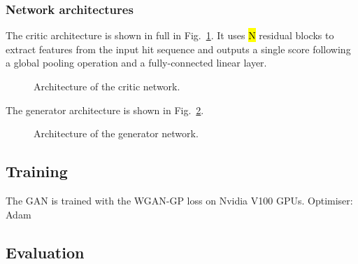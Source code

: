     
\subsubsection{Network architectures}

The critic architecture is shown in full in Fig.~\ref{fig:disc_arch}. It uses \hl{N} residual blocks to extract features from the input hit sequence and outputs a single score following a global pooling operation and a fully-connected linear layer.

\begin{figure}
    \centering
    \caption{Architecture of the critic network.}
    \label{fig:disc_arch}
\end{figure}

The generator architecture is shown in Fig.~\ref{fig:gen_arch}.

\begin{figure}
    \centering
    \caption{Architecture of the generator network.}
    \label{fig:gen_arch}
\end{figure}

\subsection{Training}

The GAN is trained with the WGAN-GP loss on Nvidia V100 GPUs.
Optimiser: Adam

\subsection{Evaluation}









